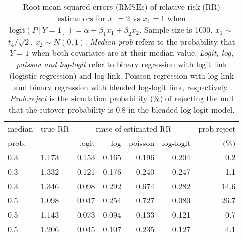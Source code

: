 \documentclass[12pt,a4paper]{article}
\begin{document}
\begin{table}[H] 
\small\sf\centering 
\caption{Root mean squared errors (RMSEs) of relative risk (RR) estimators for $x_1=2$ vs $x_1=1$ when $\mbox{logit}(P[Y=1])=\alpha+\beta_1 x_1 + \beta_2 x_2$. Sample size is 1000. $x_1 \sim $$t_4/\sqrt{2}$, $x_2 \sim N(0,1)$. {\it Median prob} refers to the probability that $Y=1$ when both covariates are at their median value. {\it Logit, log, poisson and log-logit} refer to binary regression with logit link (logistic regression) and log link, Poisson regression with log link and binary regression with blended log-logit link, respectively. {\it Prob.reject} is the simulation probability (\%) of rejecting the null that the cutover probability is $0.8$ in the blended log-logit model.} 
\begin{tabular}{llrrrrr} 
\toprule 
median & true RR & \multicolumn{4}{c}{rmse of estimated RR} & prob.reject \\ 
prob. & & logit & log & poisson & log-logit  & (\%) \\ \midrule 
0.3 & 1.173 & 0.153 & 0.165 & 0.196 & 0.204 &  0.2 \\  
0.3 & 1.332 & 0.121 & 0.176 & 0.240 & 0.247 &  1.1 \\  
0.3 & 1.346 & 0.098 & 0.292 & 0.674 & 0.282 & 14.6 \\  
0.5 & 1.098 & 0.047 & 0.254 & 0.727 & 0.080 & 26.7 \\  
0.5 & 1.143 & 0.073 & 0.094 & 0.133 & 0.121 &  0.7 \\  
0.5 & 1.206 & 0.045 & 0.107 & 0.235 & 0.127 &  4.1 \\  
\bottomrule 
\end{tabular} 
\end{table} 
\end{document}
